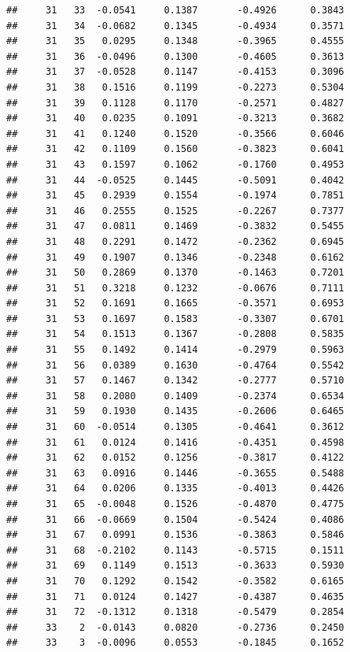 \documentclass[
]{article}
\begin{document}
\begin{verbatim}
##     31   33  -0.0541     0.1387       -0.4926      0.3843  
##     31   34  -0.0682     0.1345       -0.4934      0.3571  
##     31   35   0.0295     0.1348       -0.3965      0.4555  
##     31   36  -0.0496     0.1300       -0.4605      0.3613  
##     31   37  -0.0528     0.1147       -0.4153      0.3096  
##     31   38   0.1516     0.1199       -0.2273      0.5304  
##     31   39   0.1128     0.1170       -0.2571      0.4827  
##     31   40   0.0235     0.1091       -0.3213      0.3682  
##     31   41   0.1240     0.1520       -0.3566      0.6046  
##     31   42   0.1109     0.1560       -0.3823      0.6041  
##     31   43   0.1597     0.1062       -0.1760      0.4953  
##     31   44  -0.0525     0.1445       -0.5091      0.4042  
##     31   45   0.2939     0.1554       -0.1974      0.7851  
##     31   46   0.2555     0.1525       -0.2267      0.7377  
##     31   47   0.0811     0.1469       -0.3832      0.5455  
##     31   48   0.2291     0.1472       -0.2362      0.6945  
##     31   49   0.1907     0.1346       -0.2348      0.6162  
##     31   50   0.2869     0.1370       -0.1463      0.7201  
##     31   51   0.3218     0.1232       -0.0676      0.7111  
##     31   52   0.1691     0.1665       -0.3571      0.6953  
##     31   53   0.1697     0.1583       -0.3307      0.6701  
##     31   54   0.1513     0.1367       -0.2808      0.5835  
##     31   55   0.1492     0.1414       -0.2979      0.5963  
##     31   56   0.0389     0.1630       -0.4764      0.5542  
##     31   57   0.1467     0.1342       -0.2777      0.5710  
##     31   58   0.2080     0.1409       -0.2374      0.6534  
##     31   59   0.1930     0.1435       -0.2606      0.6465  
##     31   60  -0.0514     0.1305       -0.4641      0.3612  
##     31   61   0.0124     0.1416       -0.4351      0.4598  
##     31   62   0.0152     0.1256       -0.3817      0.4122  
##     31   63   0.0916     0.1446       -0.3655      0.5488  
##     31   64   0.0206     0.1335       -0.4013      0.4426  
##     31   65  -0.0048     0.1526       -0.4870      0.4775  
##     31   66  -0.0669     0.1504       -0.5424      0.4086  
##     31   67   0.0991     0.1536       -0.3863      0.5846  
##     31   68  -0.2102     0.1143       -0.5715      0.1511  
##     31   69   0.1149     0.1513       -0.3633      0.5930  
##     31   70   0.1292     0.1542       -0.3582      0.6165  
##     31   71   0.0124     0.1427       -0.4387      0.4635  
##     31   72  -0.1312     0.1318       -0.5479      0.2854  
##     33    2  -0.0143     0.0820       -0.2736      0.2450  
##     33    3  -0.0096     0.0553       -0.1845      0.1652  

\end{verbatim}
\end{document}
